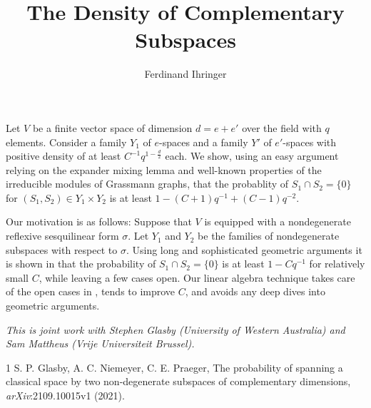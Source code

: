 \documentclass[a4paper]{amsart}
\date{}
\begin{document}
\title{The Density of Complementary Subspaces}
\author{Ferdinand Ihringer} %
\address{Universiteit Gent} %

\maketitle


Let $V$ be a finite vector space of dimension $d = e + e'$ over the field
with $q$ elements.
Consider a family $Y_1$ of $e$-spaces and 
a family $Y'$ of $e'$-spaces with positive density of at least $C^{-1} q^{1 - \frac{d}{2}}$ each. 
We show, using an easy argument relying on the expander mixing lemma
and well-known properties of the irreducible modules of Grassmann graphs, 
that the probablity of $S_1 \cap S_2 = \{0\}$ for $(S_1, S_2) \in Y_1 \times Y_2$
is at least $1 - (C+1)q^{-1} + (C-1)q^{-2}$.

Our motivation is as follows:
Suppose that $V$ is equipped with a nondegenerate reflexive sesquilinear form $\sigma$.
Let $Y_1$ and $Y_2$ be the families of nondegenerate subspaces with respect to $\sigma$.
Using long and sophisticated geometric arguments
it is shown in \cite{GNP2021} that the probability of 
$S_1 \cap S_2 = \{0\}$ is at least $1 - Cq^{-1}$ for relatively small $C$,
while leaving a few cases open.
Our linear algebra technique takes care of the open 
cases in \cite{GNP2021}, tends to improve $C$, and avoids any deep dives into geometric arguments.

\emph{This is joint work with Stephen Glasby (University of Western Australia) and Sam Mattheus (Vrije Universiteit Brussel).}

\begin{thebibliography}{1}
S. P. Glasby, A. C. Niemeyer, C. E. Praeger,
The probability of spanning a classical space by two
non-degenerate subspaces of complementary dimensions,
{\it arXiv}:2109.10015v1 (2021).
% 
\end{thebibliography}
\end{document}
